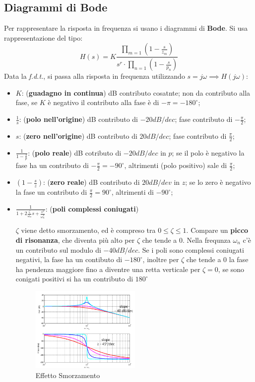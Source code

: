 \documentclass[12pt]{article}
\begin{document}
\subsection{Diagrammi di Bode}
Per rappresentare la risposta in frequenza si usano i diagrammi di \textbf{Bode}. Si usa rappresentazione del tipo:
\[ H(s) = K \frac{\prod_{m=1} (1 - \frac{s}{z_m}) }{ s^{r} \cdot \prod_{n=1} (1- \frac{s}{p_n} )  }  \]
Data la \emph{f.d.t.}, si passa alla risposta in frequenza utilizzando $s = j\omega \implies H(j\omega)$:
\begin{itemize}
    \item $K$: (\textbf{guadagno in continua}) dB contributo cosatnte; non da contributo alla fase, se $K$ \`e negativo il contributo alla fase \`e di $-\pi = -180^{\circ}$;
    \item $\displaystyle \frac{1}{s} $: (\textbf{polo nell'origine}) dB contributo di $-20dB/dec$; fase contributo di $-\frac{\pi}{2}$;
    \item $s$: (\textbf{zero nell'origine}) dB contributo di $20dB/dec$; fase contributo di $\frac{\pi}{2} $;
    \item $\displaystyle \frac{1}{1-\frac{s}{p} } $: (\textbf{polo reale}) dB cotributo di $-20dB/dec$ in $p$; se il polo \`e negativo la fase ha un contributo di $-\frac{\pi}{2} = -90^{\circ}$, altrimenti (polo positivo) sale di $\frac{\pi}{2} $;
    \item $\displaystyle \left( 1- \frac{s}{z} \right)$: (\textbf{zero reale}) dB contributo di $20dB/dev$ in $z$; se lo zero \`e negativo la fase un contributo di $\frac{\pi}{2} = 90^{\circ}$, altrimenti di $-90^{\circ}$;

    \item $\displaystyle \frac{1}{\displaystyle 1+2 \frac{\zeta}{\omega_n}s + \frac{s^{2}}{\omega_n^{2}} }$: (\textbf{poli complessi coniugati})

        $\zeta$ viene detto smorzamento, ed \`e compreso tra $0 \leqslant \zeta \leqslant 1$. Compare un \textbf{picco di risonanza}, che diventa pi\`u alto per $\zeta$ che tende a 0. Nella frequnza $\omega_n$ c'\`e un contributo sul modulo di $-40dB/dec$. Se i poli sono complessi coniugati negativi, la fase ha un contibuto di $-180^{\circ}$, inoltre per $\zeta$ che tende a 0 la fase ha pendenza maggiore fino a diventre una retta verticale per $\zeta = 0$, se sono conigati positivi si ha un contributo di $180^{\circ}$
        \begin{figure}[H]
            \centering
            \includegraphics[width=0.5\textwidth]{effetto-smorzamento.png}
            \caption{Effetto Smorzamento}
            \label{fig:effetto-smorzamento}
        \end{figure}


\end{itemize}
\end{document}
